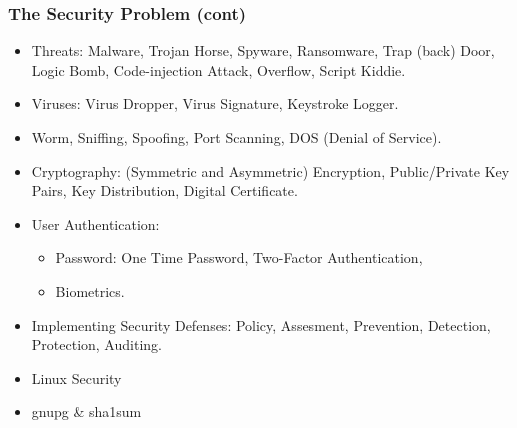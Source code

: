 \documentclass[xcolor=table, notheorems, hyperref={pdfpagelabels=false}]{beamer}
\begin{document}
\begin{frame}[fragile]
\frametitle{The Security Problem (cont)}
\begin{itemize}
\item Threats: Malware, Trojan Horse, Spyware, Ransomware, Trap (back) Door,
      Logic Bomb, Code-injection Attack, Overflow, Script Kiddie.
\item Viruses: Virus Dropper, Virus Signature, Keystroke Logger.
\item Worm, Sniffing, Spoofing, Port Scanning, DOS (Denial of Service).
\item Cryptography: (Symmetric and Asymmetric) Encryption, Public/Private Key Pairs,
      Key Distribution, Digital Certificate.
\item User Authentication: 
\begin{itemize}
\item Password: One Time Password, Two-Factor Authentication,
\item Biometrics.
\end{itemize}
\item Implementing Security Defenses: Policy, Assesment, Prevention, Detection, Protection, Auditing.
\item Linux Security
\item gnupg \& sha1sum
\end{itemize}
\end{frame}

\end{document}
